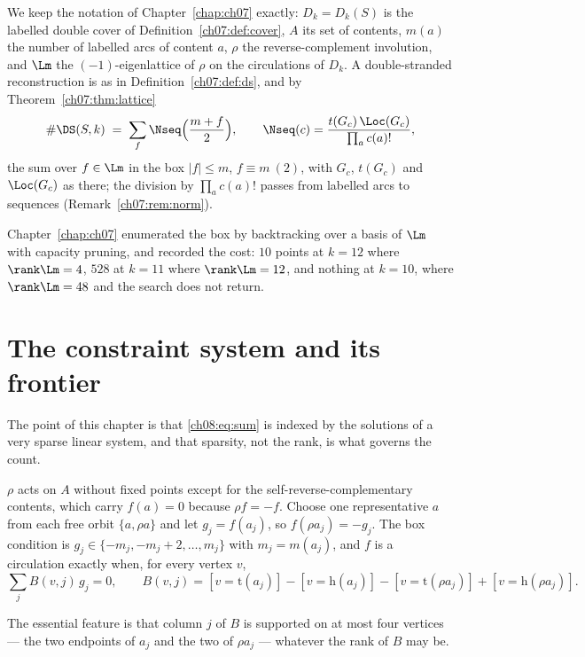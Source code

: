 We keep the notation of Chapter~\ref{chap:ch07} exactly: $D_k=D_k(S)$ is the labelled double
cover of Definition~\ref{ch07:def:cover}, $A$ its set of contents, $m(a)$ the number of labelled
arcs of content $a$, $\rho$ the reverse-complement involution, and $\Lm$ the $(-1)$-eigenlattice
of $\rho$ on the circulations of $D_k$. A double-stranded reconstruction is as in
Definition~\ref{ch07:def:ds}, and by Theorem~\ref{ch07:thm:lattice}
\begin{equation}\label{ch08:eq:sum}
\#\DS(S,k)\;=\;\sum_{f}\Nseq\Big(\frac{m+f}{2}\Big),
\qquad
\Nseq(c)=\frac{t(G_c)\,\Loc(G_c)}{\prod_a c(a)!},
\end{equation}
the sum over $f\in\Lm$ in the box $|f|\le m$, $f\equiv m\ (2)$, with $G_c$, $t(G_c)$ and
$\Loc(G_c)$ as there; the division by $\prod_a c(a)!$ passes from labelled arcs to sequences
(Remark~\ref{ch07:rem:norm}).

Chapter~\ref{chap:ch07} enumerated the box by backtracking over a basis of $\Lm$ with capacity pruning, and
recorded the cost: $10$ points at $k=12$ where $\rank\Lm=4$, $528$ at $k=11$ where
$\rank\Lm=12$, and nothing at $k=10$, where $\rank\Lm=48$ and the search does not return.

\section{The constraint system and its frontier}\label{ch08:sec:frontier}

The point of this chapter is that \eqref{ch08:eq:sum} is indexed by the solutions of a very sparse
linear system, and that sparsity, not the rank, is what governs the count.

\begin{definition}\label{ch08:def:vars}
$\rho$ acts on $A$ without fixed points except for the self-reverse-complementary contents,
which carry $f(a)=0$ because $\rho f=-f$. Choose one representative $a$ from each free orbit
$\{a,\rho a\}$ and let $g_j=f(a_j)$, so $f(\rho a_j)=-g_j$. The box condition is
$g_j\in\{-m_j,-m_j+2,\dots,m_j\}$ with $m_j=m(a_j)$, and $f$ is a circulation exactly when,
for every vertex $v$,
\begin{equation}\label{ch08:eq:bal}
\sum_j B(v,j)\,g_j=0,\qquad
B(v,j)=[v=\mathrm{t}(a_j)]-[v=\mathrm{h}(a_j)]-[v=\mathrm{t}(\rho a_j)]+[v=\mathrm{h}(\rho a_j)] .
\end{equation}
\end{definition}

The essential feature is that column $j$ of $B$ is supported on at most four vertices --- the
two endpoints of $a_j$ and the two of $\rho a_j$ --- whatever the rank of $B$ may be.

